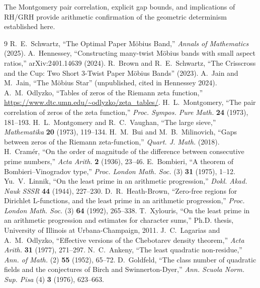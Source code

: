 \documentclass[11pt,a4paper]{article}
\begin{document}
The Montgomery pair correlation, explicit gap bounds, and implications of RH/GRH provide arithmetic confirmation of the geometric determinism established here.


\begin{thebibliography}{9}
 R.~E.~Schwartz, ``The Optimal Paper M\"obius Band,'' \emph{Annals of Mathematics} (2025).
 A.~Hennessey, ``Constructing many-twist M\"obius bands with small aspect ratios,'' arXiv:2401.14639 (2024).
 R.~Brown and R.~E.~Schwartz, ``The Crisscross and the Cup: Two Short 3-Twist Paper M\"obius Bands'' (2023).
 A.~Jain and M.~Jain, ``The M\"obius Star'' (unpublished, cited in Hennessey 2024).
 A.~M.~Odlyzko, ``Tables of zeros of the Riemann zeta function,'' \url{https://www.dtc.umn.edu/~odlyzko/zeta_tables/}.
 H.~L.~Montgomery, ``The pair correlation of zeros of the zeta function,'' \emph{Proc. Sympos. Pure Math.} \textbf{24} (1973), 181--193.
 H.~L.~Montgomery and R.~C.~Vaughan, ``The large sieve,'' \emph{Mathematika} \textbf{20} (1973), 119--134.
 H.~M.~Bui and M.~B.~Milinovich, ``Gaps between zeros of the Riemann zeta-function,'' \emph{Quart. J. Math.} (2018).
 H.~Cramér, ``On the order of magnitude of the difference between consecutive prime numbers,'' \emph{Acta Arith.} \textbf{2} (1936), 23--46.
 E.~Bombieri, ``A theorem of Bombieri--Vinogradov type,'' \emph{Proc. London Math. Soc.} (3) \textbf{31} (1975), 1--12.
 Yu.~V.~Linnik, ``On the least prime in an arithmetic progression,'' \emph{Dokl. Akad. Nauk SSSR} \textbf{44} (1944), 227--230.
 D.~R.~Heath-Brown, ``Zero-free regions for Dirichlet L-functions, and the least prime in an arithmetic progression,'' \emph{Proc. London Math. Soc.} (3) \textbf{64} (1992), 265--338.
 T.~Xylouris, ``On the least prime in an arithmetic progression and estimates for character sums,'' Ph.D. thesis, University of Illinois at Urbana-Champaign, 2011.
 J.~C.~Lagarias and A.~M.~Odlyzko, ``Effective versions of the Chebotarev density theorem,'' \emph{Acta Arith.} \textbf{31} (1977), 271--297.
 N.~C.~Ankeny, ``The least quadratic non-residue,'' \emph{Ann. of Math.} (2) \textbf{55} (1952), 65--72.
 D.~Goldfeld, ``The class number of quadratic fields and the conjectures of Birch and Swinnerton-Dyer,'' \emph{Ann. Scuola Norm. Sup. Pisa} (4) \textbf{3} (1976), 623--663.

\end{thebibliography}
\end{document}
